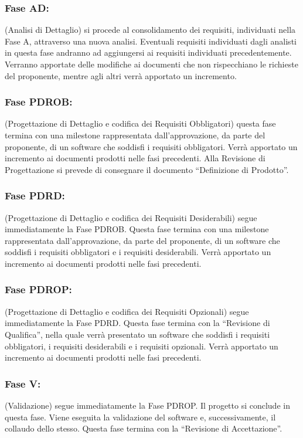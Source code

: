 \documentclass[../PianoProgetto.tex]{subfiles}
\begin{document}
		\subsubsection{Fase AD:}
		(Analisi di Dettaglio) si procede al consolidamento dei requisiti, individuati nella Fase A, attraverso una nuova analisi.
		Eventuali requisiti individuati dagli analisti in questa fase andranno ad aggiungersi ai requisiti individuati precedentemente. 
		Verranno apportate delle modifiche ai documenti che non rispecchiano le richieste del proponente, mentre agli altri verrà apportato un incremento.


		\subsubsection{Fase PDROB:}
		(Progettazione di Dettaglio e codifica dei Requisiti Obbligatori) questa fase termina con una milestone rappresentata dall’approvazione, da parte del proponente, di un software che soddisfi i requisiti obbligatori.
		Verrà apportato un incremento ai documenti prodotti nelle fasi precedenti.
		Alla Revisione di Progettazione si prevede di consegnare il documento “Definizione di Prodotto”.
  
  
		\subsubsection{Fase PDRD:}
		(Progettazione di Dettaglio e codifica dei Requisiti Desiderabili) segue immediatamente la Fase PDROB. Questa fase termina con una milestone rappresentata dall’approvazione, da parte del proponente, di un software che soddisfi i requisiti obbligatori e i requisiti desiderabili.
		Verrà apportato un incremento ai documenti prodotti nelle fasi precedenti.


		\subsubsection{Fase PDROP:}
		(Progettazione di Dettaglio e codifica dei Requisiti Opzionali) segue immediatamente la Fase PDRD. Questa fase termina con la “Revisione di Qualifica”, nella quale verrà presentato un software che soddisfi i requisiti obbligatori, i requisiti desiderabili e i requisiti opzionali.
		Verrà apportato un incremento ai documenti prodotti nelle fasi precedenti.


		\subsubsection{Fase V:}
		(Validazione) segue immediatamente la Fase PDROP. Il progetto si conclude in questa fase. Viene eseguita la validazione del software e, successivamente, il collaudo dello stesso.
		Questa fase termina con la “Revisione di Accettazione”. 
\end{document}

